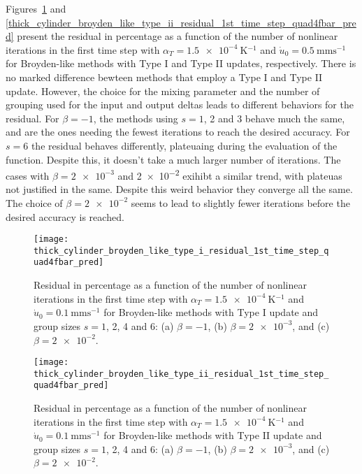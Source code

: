 Figures~\ref{fig:thick_cylinder_broyden_like_type_i_residual_1st_time_step_quad4fbar_pred} and \ref{thick_cylinder_broyden_like_type_ii_residual_1st_time_step_quad4fbar_pred} present the residual in percentage as a function of the number of nonlinear iterations in the first time step with \(\alpha_T=\SI{1.5e-4}{\kelvin^{-1}}\) and \(\dot u_0 =\SI{0.5}{\milli\meter\second^{-1}}\) for Broyden-like methods with Type I and Type II updates, respectively.
There is no marked difference bewteen methods that employ a Type I and Type II update.
However, the choice for the mixing parameter and the number of grouping used for the input and output deltas leads to different behaviors for the residual.
For \(\beta=-1\), the methods using \(s=1\), 2 and 3 behave much the same, and are the ones needing the fewest iterations to reach the desired accuracy.
For \(s=6\) the residual behaves differently, plateuaing during the evaluation of the function.
Despite this, it doesn't take a much larger number of iterations.
The cases with \(\beta=\num{2e-3}\) and \num{2e-2} exihibt a similar trend, with plateuas not justified in the same.
Despite this weird behavior they converge all the same.
The choice of \(\beta=\num{2e-2}\) seems to lead to slightly fewer iterations before the desired accuracy is reached.

\begin{figure}[htbp]
  \texttt{[image: thick\_cylinder\_broyden\_like\_type\_i\_residual\_1st\_time\_step\_quad4fbar\_pred]}
  \caption{Residual in percentage as a function of the number of nonlinear iterations in the first time step with \(\alpha_T=\SI{1.5e-4}{\kelvin^{-1}}\) and \(\dot u_0 =\SI{0.1}{\milli\meter\second^{-1}}\) for Broyden-like methods with Type I update and group sizes \(s=1\), 2, 4 and 6: (a) \(\beta=-1\), (b) \(\beta=\num{2e-3}\), and (c) \(\beta=\num{2e-2}\).}
\label{fig:thick_cylinder_broyden_like_type_i_residual_1st_time_step_quad4fbar_pred}
\end{figure}

\begin{figure}[htbp]
  \texttt{[image: thick\_cylinder\_broyden\_like\_type\_ii\_residual\_1st\_time\_step\_quad4fbar\_pred]}
  \caption{Residual in percentage as a function of the number of nonlinear iterations in the first time step with \(\alpha_T=\SI{1.5e-4}{\kelvin^{-1}}\) and \(\dot u_0 =\SI{0.1}{\milli\meter\second^{-1}}\) for Broyden-like methods with Type II update and group sizes \(s=1\), 2, 4 and 6: (a) \(\beta=-1\), (b) \(\beta=\num{2e-3}\), and (c) \(\beta=\num{2e-2}\).}
\label{fig:thick_cylinder_broyden_like_type_ii_residual_1st_time_step_quad4fbar_pred}
\end{figure}

